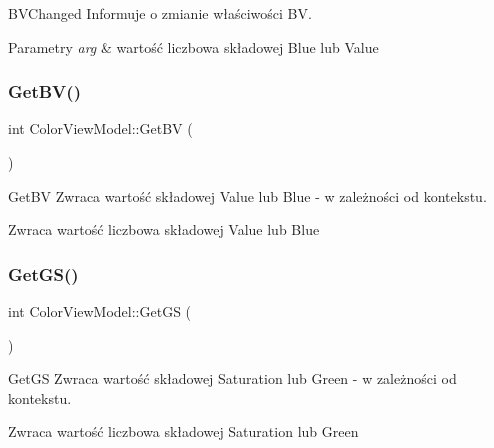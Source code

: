 B\+V\+Changed Informuje o zmianie właściwości BV. 


\begin{DoxyParams}{Parametry}
{\em arg} & wartość liczbowa składowej Blue lub Value \\
\hline
\end{DoxyParams}
\mbox{\label{class_color_view_model_ab2ee304b2a6b4ff3945fe926acd575b4}} 
\subsubsection{\texorpdfstring{Get\+B\+V()}{GetBV()}}
{\footnotesize\ttfamily int Color\+View\+Model\+::\+Get\+BV (\begin{DoxyParamCaption}{ }\end{DoxyParamCaption})}



Get\+BV Zwraca wartość składowej Value lub Blue -\/ w zależności od kontekstu. 

\begin{DoxyReturn}{Zwraca}
wartość liczbowa składowej Value lub Blue 
\end{DoxyReturn}
\mbox{\label{class_color_view_model_a82022dc5932e3c485e7f387b47251587}} 
\subsubsection{\texorpdfstring{Get\+G\+S()}{GetGS()}}
{\footnotesize\ttfamily int Color\+View\+Model\+::\+Get\+GS (\begin{DoxyParamCaption}{ }\end{DoxyParamCaption})}



Get\+GS Zwraca wartość składowej Saturation lub Green -\/ w zależności od kontekstu. 

\begin{DoxyReturn}{Zwraca}
wartość liczbowa składowej Saturation lub Green 
\end{DoxyReturn}
\mbox{\label{class_color_view_model_a8288300fcaa560f71974038e0bc191ea}} 
